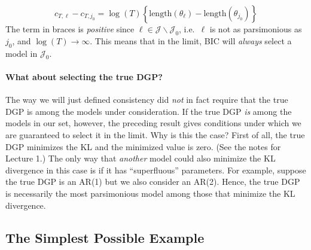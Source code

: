 \documentclass[12pt]{article}
\theoremstyle{definition}
\begin{document}
	$$c_{T,\ell} - c_{T,j_0} = \log(T) \left\{\mbox{length}(\theta_\ell) - \mbox{length}(\theta_{j_0}) \right\}$$
The term in braces is \emph{positive} since $\ell \in\mathcal{J}\backslash \mathcal{J}_0$, i.e.\ $\ell$ is not as parsimonious as $j_0$, and $\log(T) \rightarrow \infty$. This means that in the limit, BIC will \emph{always} select a model in $\mathcal{J}_0$.

\paragraph{What about selecting the true DGP?}
The way we will just defined consistency did \emph{not} in fact require that the true DGP is among the models under consideration. If the true DGP \emph{is} among the models in our set, however, the preceding result gives conditions under which we are guaranteed to select it in the limit. Why is this the case? First of all, the true DGP minimizes the KL and the minimized value is zero. (See the notes for Lecture 1.) The only way that \emph{another} model could also minimize the KL divergence in this case is if it has ``superfluous'' parameters. For example, suppose the true DGP is an AR(1) but we also consider an AR(2). Hence, the true DGP is necessarily the most parsimonious model among those that minimize the KL divergence. 
\subsection{The Simplest Possible Example}
\end{document}
